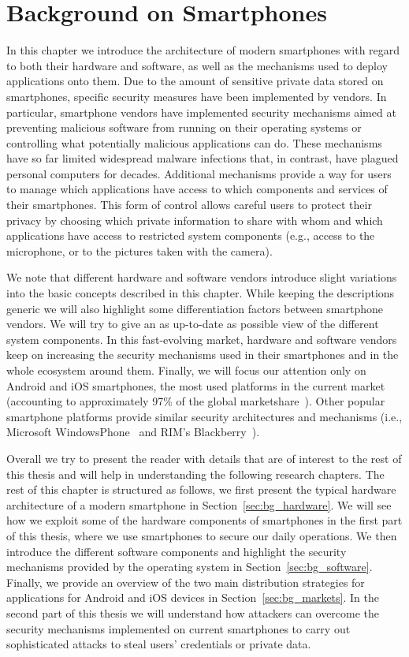 \chapter{Background on Smartphones}
\label{chap:background}

In this chapter we introduce the architecture of modern smartphones with regard to both their hardware and software, as well as the mechanisms used to deploy applications onto them. Due to the amount of sensitive private data stored on smartphones, specific security measures have been implemented by vendors. In particular, smartphone vendors have implemented security mechanisms aimed at preventing malicious software from running on their operating systems or controlling what potentially malicious applications can do. These mechanisms have so far limited widespread malware infections that, in contrast, have plagued personal computers for decades. Additional mechanisms provide a way for users to manage which applications have access to which components and services of their smartphones. This form of control allows careful users to protect their privacy by choosing which private information to share with whom and which applications have access to restricted system components (e.g., access to the microphone, or to the pictures taken with the camera).

We note that different hardware and software vendors introduce slight variations into the basic concepts described in this chapter. While keeping the descriptions generic we will also highlight some differentiation factors between smartphone vendors. We will try to give an as up-to-date as possible view of the different system components. In this fast-evolving market, hardware and software vendors keep on increasing the security mechanisms used in their smartphones and in the whole ecosystem around them. Finally, we will focus our attention only on Android and iOS smartphones, the most used platforms in the current market (accounting to approximately 97\% of the global marketshare~\cite{marketshare}). Other popular smartphone platforms provide similar security architectures and mechanisms (i.e., Microsoft WindowsPhone~\cite{windowssecurity} and RIM's Blackberry~\cite{blackberrysecurity}).

Overall we try to present the reader with details that are of interest to the rest of this thesis and will help in understanding the following research chapters. The rest of this chapter is structured as follows, we first present the typical hardware architecture of a modern smartphone in Section~\ref{sec:bg_hardware}. We will see how we exploit some of the hardware components of smartphones in the first part of this thesis, where we use smartphones to secure our daily operations. We then introduce the different software components and highlight the security mechanisms provided by the operating system in Section~\ref{sec:bg_software}. Finally, we provide an overview of the two main distribution strategies for applications for Android and iOS devices in Section~\ref{sec:bg_markets}. In the second part of this thesis we will understand how attackers can overcome the security mechanisms implemented on current smartphones to carry out sophisticated attacks to steal users' credentials or private data.

